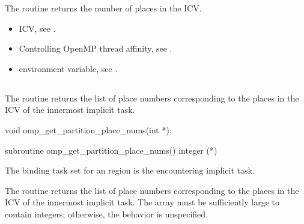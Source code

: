 \effect
The  routine returns the number of places in the  ICV.

\crossreferences
\begin{itemize}
\item {} ICV, see 
.

\item Controlling OpenMP thread affinity, see 
. 

\item {} environment variable, see 
.
\end{itemize}





\subsection{}
\label{subsec:omp_get_partition_place_nums}

\summary
The  routine returns the list of place numbers corresponding to the places in the  ICV of the innermost implicit task.

\format
\begin{ccppspecific}
\begin{boxedcode}
void omp\_get\_partition\_place\_nums(int *);
\end{boxedcode}
\end{ccppspecific}

\begin{fortranspecific}
\begin{boxedcode}
subroutine omp\_get\_partition\_place\_nums()
integer (*)
\end{boxedcode}
\end{fortranspecific}

\binding
The binding task set for an  region is the encountering implicit task.

\effect
The  routine returns the list of 
place numbers corresponding to the places in the  
ICV of the innermost implicit task. The array must be sufficiently large 
to contain  integers; otherwise, 
the behavior is unspecified.


